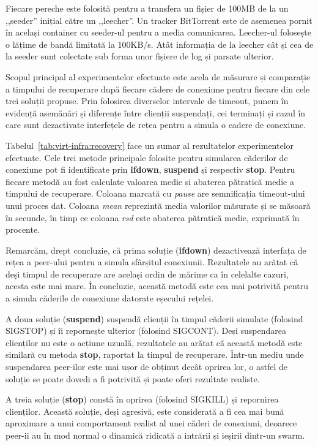 Fiecare pereche este folosită pentru a transfera un fișier de 100MB
de la un ,,seeder'' inițial către un ,,leecher''. Un tracker BitTorrent
este de asemenea pornit în același container cu seeder-ul pentru a media
comunicarea. Leecher-ul folosește o lățime de bandă limitată la 100KB/s.
Atât informația de la leecher cât și cea de la seeder sunt colectate
sub forma unor fișiere de log și parsate ulterior.

Scopul principal al experimentelor efectuate este acela de măsurare și
comparație a timpului de recuperare după fiecare cădere de conexiune
pentru fiecare din cele trei soluții propuse. Prin folosirea diverselor
intervale de timeout, punem în evidență asemănări și diferențe între
clienții suspendați, cei terminați și cazul în care sunt dezactivate
interfețele de rețea pentru a simula o cadere de conexiune.



Tabelul~\ref{tab:virt-infra:recovery} face un sumar al rezultatelor
experimentelor efectuate. Cele trei metode principale folosite pentru
simularea căderilor de conexiune pot fi identificate prin \textbf{ifdown},
\textbf{suspend} și respectiv \textbf{stop}. Pentru fiecare metodă au
fost calculate valoarea medie și abaterea pătratică medie a timpului de 
recuperare. Coloana marcată cu \textit{pause} are semnificația timeout-ului
unui proces dat. Coloana \textit{mean} reprezintă media valorilor măsurate
și se măsoară în secunde, în timp ce coloana \textit{rsd} este abaterea
pătratică medie, exprimată în procente.

Remarcăm, drept concluzie, că prima soluție (\textbf{ifdown}) dezactivează
interfața de rețea a peer-ului pentru a simula sfârșitul conexiunii.
Rezultatele au arătat că deși timpul de recuperare are același ordin de
mărime ca în celelalte cazuri, acesta este mai mare. În concluzie, această
metodă este cea mai potrivită pentru a simula căderile de conexiune datorate
eșecului rețelei.

A doua soluție (\textbf{suspend}) suspendă clienții în timpul căderii
simulate (folosind SIGSTOP) și îi repornește ulterior (folosind SIGCONT).
Deși suspendarea clienților nu este o acțiune uzuală, rezultatele au arătat
că această metodă este similară cu metoda \textbf{stop}, raportat la timpul
de recuperare. Într-un mediu unde suspendarea peer-ilor este mai ușor de
obținut decât oprirea lor, o astfel de soluție se poate dovedi a fi
potrivită și poate oferi rezultate realiste.

A treia soluție (\textbf{stop}) constă în oprirea (folosind SIGKILL) și
repornirea clienților. Această soluție, deși agresivă, este
considerată a fi cea mai bună aproximare a unui comportament realist al
unei căderi de conexiuni, deoarece peer-ii au în mod normal o dinamică
ridicată a intrării și ieșirii dintr-un swarm.

